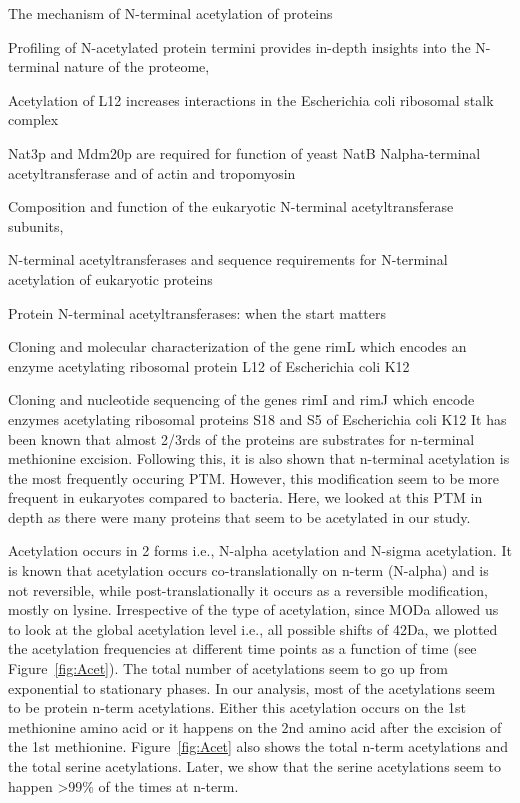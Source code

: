 \documentclass[12pt]{article}
\begin{document}
\cite{Driessenetal1985}
{The mechanism of N-terminal acetylation of proteins}

\cite{Helbigetal2010}
{Profiling of N-acetylated protein termini provides in-depth insights into the N-terminal nature of the proteome},

\cite{Gordiyenkoetal2008}
 {Acetylation of L12 increases interactions in the Escherichia coli ribosomal stalk complex}
 
\cite{Polevodaetal2003}
{Nat3p and Mdm20p are required for function of yeast NatB Nalpha-terminal acetyltransferase and of actin and tropomyosin}
   
\cite{PolevodaSherman2003}
{Composition and function of the eukaryotic N-terminal acetyltransferase subunits},
   
\cite{PolevodaSherman2003b}
{N-terminal acetyltransferases and sequence requirements for N-terminal acetylation of eukaryotic proteins}

\cite{Starheimetal2012}
{Protein N-terminal acetyltransferases: when the start matters}

\cite{Tanakaetal1989}
{Cloning and molecular characterization of the gene rimL which encodes an enzyme acetylating ribosomal protein L12 of Escherichia coli K12}

\cite{Yoshikawaetal1987}
{Cloning and nucleotide sequencing of the genes rimI and rimJ which encode enzymes acetylating ribosomal proteins S18 and S5 of Escherichia coli K12}
It has been known that almost 2/3rds of the proteins are substrates for n-terminal methionine excision. Following this, it is also shown that n-terminal acetylation is the most frequently occuring PTM. However, this modification seem to be more frequent in eukaryotes compared to bacteria. Here, we looked at this PTM in depth as there were many proteins that seem to be acetylated in our study. 

Acetylation occurs in 2 forms i.e., N-{alpha} acetylation and N-{sigma} acetylation. It is known that acetylation occurs co-translationally on n-term (N-{alpha}) and is not reversible, while post-translationally it occurs as a reversible modification, mostly on lysine. Irrespective of the type of acetylation, since MODa allowed us to look at the global acetylation level i.e., all possible shifts of 42Da, we plotted the acetylation frequencies at different time points as a function of time (see Figure~\ref{fig:Acet}). The total number of acetylations seem to go up from exponential to stationary phases. In our analysis, most of the acetylations seem to be protein n-term acetylations. Either this acetylation occurs on the 1st methionine amino acid or it happens on the 2nd amino acid after the excision of the 1st methionine. Figure~\ref{fig:Acet} also shows the total n-term acetylations and the total serine acetylations. Later, we show that the serine acetylations seem to happen >99\% of the times at n-term.
\end{document}
